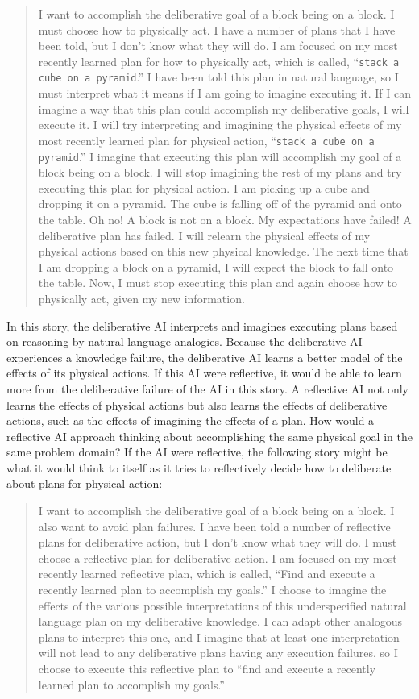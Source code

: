 \begin{quote}
  I want to accomplish the deliberative goal of a block being on a
  block.  I must choose how to physically act.  I have a number of
  plans that I have been told, but I don't know what they will do.  I
  am focused on my most recently learned plan for how to physically
  act, which is called, ``{\tt{stack a cube on a pyramid}}.''  I have
  been told this plan in natural language, so I must interpret what it
  means if I am going to imagine executing it.  If I can imagine a way
  that this plan could accomplish my deliberative goals, I will
  execute it.  I will try interpreting and imagining the physical
  effects of my most recently learned plan for physical action,
  ``{\tt{stack a cube on a pyramid}}.''  I imagine that executing this
  plan will accomplish my goal of a block being on a block.  I will
  stop imagining the rest of my plans and try executing this plan for
  physical action.  I am picking up a cube and dropping it on a
  pyramid.  The cube is falling off of the pyramid and onto the table.
  Oh no!  A block is not on a block.  My expectations have failed!  A
  deliberative plan has failed.  I will relearn the physical effects
  of my physical actions based on this new physical knowledge.  The
  next time that I am dropping a block on a pyramid, I will expect the
  block to fall onto the table.  Now, I must stop executing this plan
  and again choose how to physically act, given my new information.
\end{quote}
In this story, the deliberative AI interprets and imagines executing
plans based on reasoning by natural language analogies.  Because the
deliberative AI experiences a knowledge failure, the deliberative AI
learns a better model of the effects of its physical actions.  If this
AI were reflective, it would be able to learn more from the
deliberative failure of the AI in this story.  A reflective AI not
only learns the effects of physical actions but also learns the
effects of deliberative actions, such as the effects of imagining the
effects of a plan.  How would a reflective AI approach thinking about
accomplishing the same physical goal in the same problem domain?  If
the AI were reflective, the following story might be what it would
think to itself as it tries to reflectively decide how to deliberate
about plans for physical action:
\begin{quote}
  I want to accomplish the deliberative goal of a block being on a
  block.  I also want to avoid plan failures.  I have been told a
  number of reflective plans for deliberative action, but I don't know
  what they will do.  I must choose a reflective plan for deliberative
  action.  I am focused on my most recently learned reflective plan,
  which is called, ``Find and execute a recently learned plan to
  accomplish my goals.''  I choose to imagine the effects of the
  various possible interpretations of this underspecified natural
  language plan on my deliberative knowledge.  I can adapt other
  analogous plans to interpret this one, and I imagine that at least
  one interpretation will not lead to any deliberative plans having
  any execution failures, so I choose to execute this reflective plan
  to ``find and execute a recently learned plan to accomplish my
  goals.''
\end{quote}
